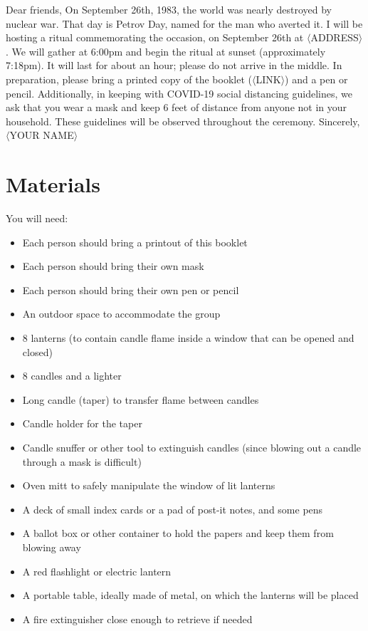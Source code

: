 \documentclass{article}
\begin{document}
\begin{center}
	\parbox{4.5in}{
	Dear friends,\newline\newline
	On September 26th, 1983, the world was nearly destroyed by nuclear war.
	That day is Petrov Day, named for the man who averted it. I will be
	hosting a ritual commemorating the occasion, on September 26th at
	$\langle$ADDRESS$\rangle$. We will gather at 6:00pm and begin the ritual
	at sunset (approximately 7:18pm). It will last for about an hour; please do
	not arrive in the middle.\newline\newline
	In preparation, please bring a printed copy of the booklet
	($\langle$LINK$\rangle$) and a pen or pencil. Additionally, in keeping with
	COVID-19 social distancing guidelines, we ask that you wear a mask and keep
	6 feet of distance from anyone not in your household. These guidelines will
	be observed throughout the ceremony.\newline\newline
	Sincerely,\newline
	$\langle$YOUR NAME$\rangle$}
\end{center}

\section{Materials}
You will need:

\begin{itemize} \itemsep0pt \parskip0pt 
	\item Each person should bring a printout of this booklet
	\item Each person should bring their own mask
	\item Each person should bring their own pen or pencil
	\item An outdoor space to accommodate the group
	\item 8 lanterns (to contain candle flame inside a window that can be opened and closed)
	\item 8 candles and a lighter
	\item Long candle (taper) to transfer flame between candles
	\item Candle holder for the taper
	\item Candle snuffer or other tool to extinguish candles (since blowing out a candle through a mask is difficult)
	\item Oven mitt to safely manipulate the window of lit lanterns
	\item A deck of small index cards or a pad of post-it notes, and some pens
	\item A ballot box or other container to hold the papers and keep them from blowing away
	\item A red flashlight or electric lantern
	\item A portable table, ideally made of metal, on which the lanterns will be placed
	\item A fire extinguisher close enough to retrieve if needed
\end{itemize}
\end{document}
